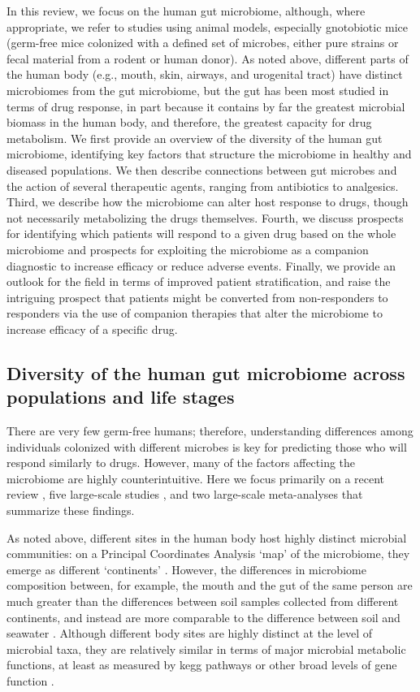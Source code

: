 In this review, we focus on the human gut microbiome, although, where appropriate, we refer to studies using animal models, especially gnotobiotic mice (germ-free mice colonized with a defined set of microbes, either pure strains or fecal material from a rodent or human donor). As noted above, different parts of the human body (e.g., mouth, skin, airways, and urogenital tract) have distinct microbiomes from the gut microbiome, but the gut has been most studied in terms of drug response, in part because it contains by far the greatest microbial biomass in the human body, and therefore, the greatest capacity for drug metabolism. We first provide an overview of the diversity of the human gut microbiome, identifying key factors that structure the microbiome in healthy and diseased populations. We then describe connections between gut microbes and the action of several therapeutic agents, ranging from antibiotics to analgesics. Third, we describe how the microbiome can alter host response to drugs, though not necessarily metabolizing the drugs themselves. Fourth, we discuss prospects for identifying which patients will respond to a given drug based on the whole microbiome and prospects for exploiting the microbiome as a companion diagnostic to increase efficacy or reduce adverse events. Finally, we provide an outlook for the field in terms of improved patient stratification, and raise the intriguing prospect that patients might be converted from non-responders to responders via the use of companion therapies that alter the microbiome to increase efficacy of a specific drug.


\subsection{Diversity of the human gut microbiome across populations and life stages}

There are very few germ-free humans; therefore, understanding differences among individuals colonized with different microbes is key for predicting those who will respond similarly to drugs. However, many of the factors affecting the microbiome are highly counterintuitive. Here we focus primarily on a recent review \cite{RN4057}, five large-scale studies \cite{RN4108, RN4104, RN35, RN4061, RN4059}, and two large-scale meta-analyses \cite{RN4025, RN4063} that summarize these findings.

As noted above, different sites in the human body host highly distinct microbial communities: on a Principal Coordinates Analysis `map' of the microbiome, they emerge as different `continents' \cite{RN4220, RN35}. However, the differences in microbiome composition between, for example, the mouth and the gut of the same person are much greater than the differences between soil samples collected from different continents, and instead are more comparable to the difference between soil and seawater \cite{RN4087}. Although different body sites are highly distinct at the level of microbial taxa, they are relatively similar in terms of major microbial metabolic functions, at least as measured by \gls{kegg} pathways or other broad levels of gene function \cite{RN35, RN4044}.

